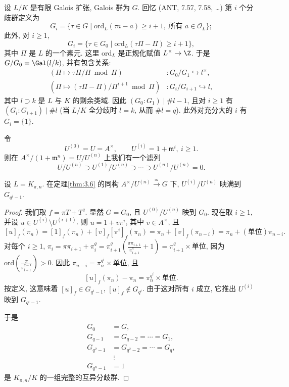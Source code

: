 设 $L/K$ 是有限 Galois 扩张, Galois 群为 $G$. 回忆 (ANT, 7.57, 7.58, \ldots) 第 $i$ 个分歧群定义为
\[
G_i=\{\tau\in G\mid\mathrm{ord}_L(\tau a-a)\ge i+1,\ \text{所有 }a\in\mathcal{O}_L\};
\]
此外, 对 $i\ge 1$,
\[
G_i=\{\tau\in G_0\mid\mathrm{ord}_L(\tau\varPi-\varPi)\ge i+1\},
\]
其中 $\varPi$ 是 $L$ 的一个素元. 这里 $\mathrm{ord}_L$ 是正规化赋值 $L^{\times}\to\Z$. 于是 $G/G_0=\Gal(l/k)$, 并有包含关系:
\[
\begin{aligned}
(\varPi\mapsto\tau\varPi/\varPi\bmod\varPi)&\colon G_0/G_1\hookrightarrow l^{\times},\\
(\varPi\mapsto(\tau\varPi-\varPi)/\varPi^{i+1}\bmod\varPi)&\colon G_i/G_{i+1}\hookrightarrow l,
\end{aligned}
\]
其中 $l\supset k$ 是 $L$ 与 $K$ 的剩余类域. 因此 $(G_0:G_1)\mid \#l-1$, 且对 $i\ge 1$ 有 $(G_i:G_{i+1})\mid \#l$ (当 $L/K$ 全分歧时 $l=k$, 从而 $\#l=q$). 此外对充分大的 $i$ 有 $G_i=\{1\}$.

令
\[
U^{(0)}=U=A^{\times},\qquad U^{(i)}=1+\mathfrak{m}^i,\ i\ge 1.
\]
则在 $A^{\times}/(1+\mathfrak{m}^n)=U/U^{(n)}$ 上我们有一个滤列
\[
U/U^{(n)}\supset U^{(1)}/U^{(n)}\supset\cdots\supset U^{(n)}/U^{(n)}=0.
\]

\begin{proposition}\label{prop:4.1}
设 $L=K_{\pi,n}$. 在定理\ref{thm:3.6} 的同构 $A^{\times}/U^{(n)}\xrightarrow{\simeq}G$ 下, $U^{(i)}/U^{(n)}$ 映满到 $G_{q^i-1}$.
\end{proposition}

\begin{proof}
我们取 $f=\pi T+T^q$. 显然 $G=G_0$, 且 $U^{(0)}/U^{(n)}$ 映到 $G_0$. 现在取 $i\ge 1$, 并设 $u\in U^{(i)}\setminus U^{(i+1)}$. 则 $u=1+v\pi^i$, 其中 $v\in A^{\times}$, 且
\[
[u]_f(\pi_n)=[1]_f(\pi_n)+[v]_f[\pi^i]_f(\pi_n)=\pi_n+[v]_f(\pi_{n-i})=\pi_n+(\text{单位})\pi_{n-i}.
\]
对每个 $i\ge 1$, $\pi_i=\pi\pi_{i+1}+\pi_i^q=\pi_{i+1}^q(\frac{\pi\pi_{i+1}}{\pi_{i+1}^q}+1)=\pi_{i+1}^q\times\text{单位}$, 因为 $\mathrm{ord}(\frac{\pi}{\pi_{i+1}^{q-1}})>0$. 因此 $\pi_{n-i}=\pi_n^{q^i}\times\text{单位}$, 且
\[
[u]_f(\pi_n)-\pi_n=\pi_n^{q^i}\times\text{单位}.
\]
按定义, 这意味着 $[u]_f\in G_{q^i-1}$, $[u]_f\notin G_{q^i}$. 由于这对所有 $i$ 成立, 它推出 $U^{(i)}$ 映到 $G_{q^i-1}$.

于是
\[
\begin{aligned}
G_0&=G,\\
G_{q-1}&=G_{q-2}=\cdots=G_1,\\
G_{q^2-1}&=G_{q^2-2}=\cdots=G_q,\\
&\ \vdots\\
G_{q^n-1}&=1
\end{aligned}
\]
是 $K_{\pi,n}/K$ 的一组完整的互异分歧群.
\end{proof}

